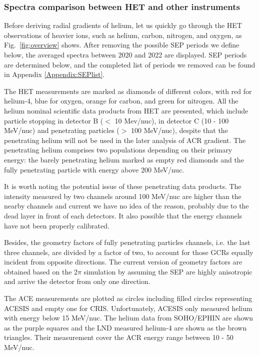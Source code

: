 \subsubsection*{Spectra comparison between \ac{HET} and other instruments}
Before deriving radial gradients of helium, let us quickly go through the \ac{HET} observations of heavier ions, such as helium, carbon, nitrogen, and oxygen, as Fig.~\ref{fig:overview} shows. After removing the possible \ac{SEP} periods we define below, the averaged spectra between 2020 and 2022 are displayed. \ac{SEP} periods are determined below, and the completed list of periods we removed can be found in Appendix \ref{Appendix:SEPlist}.

The \ac{HET} measurements are marked as diamonds of different colors, with red for helium-4, blue for oxygen, orange for carbon, and green for nitrogen.
All the helium nominal scientific data products from \ac{HET} are presented, which include particle stopping in detector B ($<$ 10 Mev/nuc), in detector C (10 - 100 MeV/nuc) and penetrating particles ($>$ 100 MeV/nuc), despite that the penetrating helium will not be used in the later analysis of \ac{ACR} gradient.
The penetrating helium comprises two populations depending on their primary energy: the barely penetrating helium marked as empty red diamonds and the fully penetrating particle with energy above 200 MeV/nuc. 

It is worth noting the potential issue of these penetrating data products. The intensity measured by two channels around 100 MeV/nuc are higher than the nearby channels and current we have no idea of the reason, probably due to the dead layer in front of each detectors\citep{Wimmer2021AA}. It also possible that the energy channels have not been properly calibrated.

Besides, the geometry factors of fully penetrating particles channels, i.e. the last three channels, are divided by a factor of two, to account for those \acp{GCR} equally incident from opposite directions. The current version of geometry factors are obtained based on the 2$\pi$ simulation by assuming the \ac{SEP} are highly anisotropic and arrive the detector from only one direction. 

The \ac{ACE} measurements are plotted as circles including filled circles representing \ac{ACESIS} and empty one for \ac{CRIS}. Unfortunately, \ac{ACESIS} only measured helium with energy below 15 MeV/nuc.
The helium data from \ac{SOHO}/\ac{EPHIN} are shown as the purple squares and the \ac{LND} measured helium-4 are shown as the brown triangles. Their measurement cover the \ac{ACR} energy range between 10 - 50 MeV/nuc.

